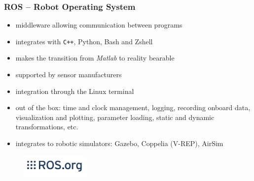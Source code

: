 \documentclass[aspectratio=169]{beamer}
\begin{document}


            \begin{frame}
              \frametitle{ROS -- Robot Operating System}

              \begin{itemize}
                \item middleware allowing communication between programs
                \item integrates with \texttt{C++}, Python, Bash and Zshell
                \item makes the transition from \emph{Matlab} to reality bearable
                \item supported by sensor manufacturers
                \item integration through the Linux terminal
                \item out of the box: time and clock management, logging, recording onboard data, visualization and plotting, parameter loading, static and dynamic transformations, etc.
                \item integrates to robotic simulators: Gazebo, Coppelia (V-REP), AirSim
              \end{itemize}

              \begin{figure}
                \includegraphics[width=0.3\textwidth]{fig/ros_logo.jpg}
              \end{figure}

            \end{frame}


\end{document}
